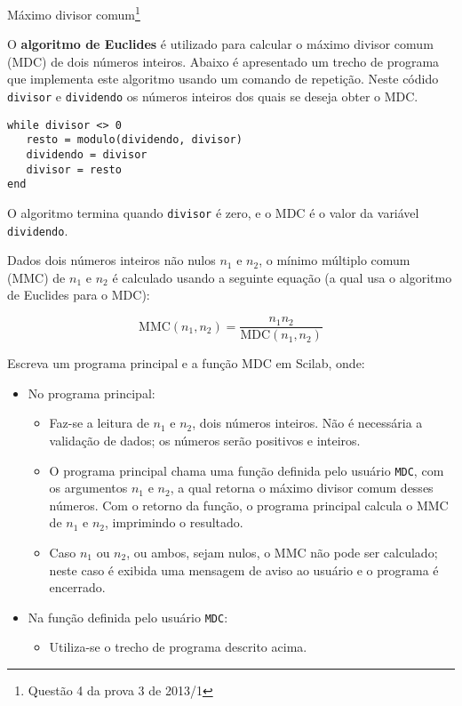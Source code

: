 \documentclass[11pt]{practice}
\begin{document}
\begin{task}[breakable]{Máximo divisor comum\footnote{Questão 4 da prova 3 de 2013/1}}{}

  O \textbf{algoritmo de Euclides} é utilizado para calcular o máximo
  divisor comum (MDC) de dois números inteiros. Abaixo é apresentado um
  trecho de programa que implementa este algoritmo usando um comando de
  repetição. Neste códido \texttt{divisor} e \texttt{dividendo} os
  números inteiros dos quais se deseja obter o MDC.
 
  \begin{verbatim}
while divisor <> 0
   resto = modulo(dividendo, divisor)
   dividendo = divisor
   divisor = resto
end
  \end{verbatim}

  O algoritmo termina quando \texttt{divisor} é zero, e o MDC é o valor
  da variável \texttt{dividendo}.
 
  Dados dois números inteiros não nulos $n_1$ e $n_2$, o mínimo múltiplo
  comum (MMC) de $n_1$ e $n_2$ é calculado usando a seguinte equação (a
  qual usa o algoritmo de Euclides para o MDC):

  \[ \text{MMC}(n_1,n_2) = \frac{n_1 n_2}{\text{MDC}(n_1,n_2)} \]

  Escreva um programa principal e a função MDC em Scilab, onde:
  \begin{itemize}
    \item No programa principal:
    \begin{itemize}
      \item Faz-se a leitura de $n_1$ e $n_2$, dois números
      inteiros. Não é necessária a validação de dados; os números serão
      positivos e inteiros.
      \item O programa principal chama uma função definida pelo usuário
      \texttt{MDC}, com os argumentos $n_1$ e $n_2$, a qual retorna o
      máximo divisor comum desses números. Com o retorno da função, o
      programa principal calcula o MMC de $n_1$ e $n_2$, imprimindo o
      resultado.
      \item Caso $n_1$ ou $n_2$, ou ambos, sejam nulos, o MMC não pode
      ser calculado; neste caso é exibida uma mensagem de aviso ao
      usuário e o programa é encerrado.
    \end{itemize}
    \item Na função definida pelo usuário \texttt{MDC}:
    \begin{itemize}
      \item Utiliza-se o trecho de programa descrito acima.
    \end{itemize}
  \end{itemize}


\end{task}
\end{document}
